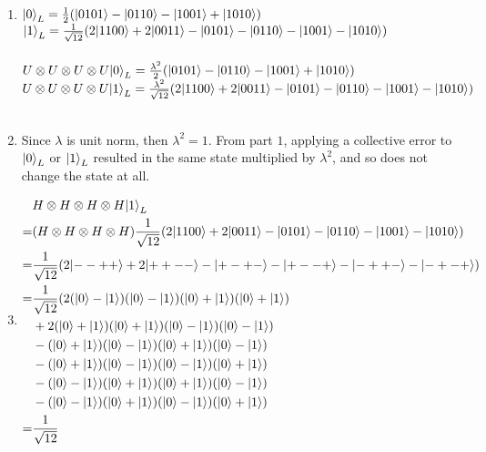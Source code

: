 \documentclass{assignment}
\begin{document}
\begin{problemlist}
  \pbitem
  \begin{problem}
  \end{problem}
  \begin{answer}
    \\
    \begin{enumerate}
    \item
      ${\left\vert{0}\right\rangle}_L=\frac{1}{2}({\left\vert{0101}\right\rangle}-{\left\vert{0110}\right\rangle}-{\left\vert{1001}\right\rangle}+{\left\vert{1010}\right\rangle})$\\
      ${\left\vert{1}\right\rangle}_L=\frac{1}{\sqrt{12}}(2{\left\vert{1100}\right\rangle}+2{\left\vert{0011}\right\rangle}-{\left\vert{0101}\right\rangle}-{\left\vert{0110}\right\rangle}-{\left\vert{1001}\right\rangle}-{\left\vert{1010}\right\rangle})$\\\\
      $U\otimes U\otimes U\otimes U{\left\vert{0}\right\rangle}_L=\frac{\lambda^2}{2}({\left\vert{0101}\right\rangle}-{\left\vert{0110}\right\rangle}-{\left\vert{1001}\right\rangle}+{\left\vert{1010}\right\rangle})$\\
      $U\otimes U\otimes U\otimes U{\left\vert{1}\right\rangle}_L=\frac{\lambda^2}{\sqrt{12}}(2{\left\vert{1100}\right\rangle}+2{\left\vert{0011}\right\rangle}-{\left\vert{0101}\right\rangle}-{\left\vert{0110}\right\rangle}-{\left\vert{1001}\right\rangle}-{\left\vert{1010}\right\rangle})$\\\\
    \item
      Since $\lambda$ is unit norm, then $\lambda^2=1$. From part $1$, applying a collective error to ${\left\vert{0}\right\rangle}_L$ or ${\left\vert{1}\right\rangle}_L$ resulted in the same state multiplied by $\lambda^2$, and so does not change the state at all.
    \item
      \begin{align*}
        &H\otimes H\otimes H\otimes H \ket{1}_L\\
        =&(H\otimes H\otimes H\otimes H)\frac{1}{\sqrt{12}}(2\ket{1100}+2\ket{0011}-\ket{0101}-\ket{0110}-\ket{1001}-\ket{1010})\\
        =&\frac{1}{\sqrt{12}}(2\ket{--++}+2\ket{++--}-\ket{+-+-}-\ket{+--+}-\ket{-++-}-\ket{-+-+})\\
        =&\frac{1}{\sqrt{12}}
        (2(\ket{0}-\ket{1})(\ket{0}-\ket{1})(\ket{0}+\ket{1})(\ket{0}+\ket{1})\\
        &+2(\ket{0}+\ket{1})(\ket{0}+\ket{1})(\ket{0}-\ket{1})(\ket{0}-\ket{1})\\
        &-(\ket{0}+\ket{1})(\ket{0}-\ket{1})(\ket{0}+\ket{1})(\ket{0}-\ket{1})\\
        &-(\ket{0}+\ket{1})(\ket{0}-\ket{1})(\ket{0}-\ket{1})(\ket{0}+\ket{1})\\
        &-(\ket{0}-\ket{1})(\ket{0}+\ket{1})(\ket{0}+\ket{1})(\ket{0}-\ket{1})\\
        &-(\ket{0}-\ket{1})(\ket{0}+\ket{1})(\ket{0}-\ket{1})(\ket{0}+\ket{1})\\
        =&\frac{1}{\sqrt{12}}\\

\end{align*}
\end{enumerate}
\end{answer}
\end{problemlist}
\end{document}
